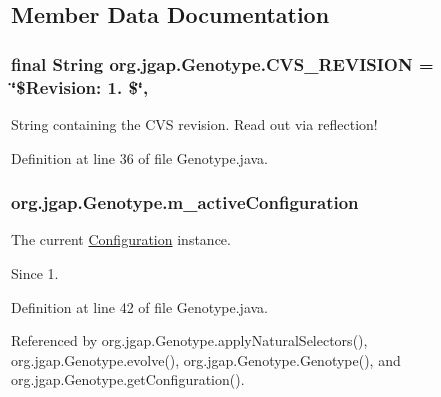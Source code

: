 \subsection{Member Data Documentation}
\hypertarget{classorg_1_1jgap_1_1_genotype_ac9f8e9d203b7a4efdf8c2e32a08f84bb}{
\subsubsection[{C\-V\-S\-\_\-\-R\-E\-V\-I\-S\-I\-O\-N}]{\setlength{\rightskip}{0pt plus 5cm}final String org.\-jgap.\-Genotype.\-C\-V\-S\-\_\-\-R\-E\-V\-I\-S\-I\-O\-N = \char`\"{}\$Revision\-: 1. \$\char`\"{}\hspace{0.3cm}{\ttfamily [static]}, {\ttfamily [private]}}}\label{classorg_1_1jgap_1_1_genotype_ac9f8e9d203b7a4efdf8c2e32a08f84bb}
String containing the C\-V\-S revision. Read out via reflection! 

Definition at line 36 of file Genotype.\-java.

\hypertarget{classorg_1_1jgap_1_1_genotype_aeb3fac2610b8ef8fa8599fcac1b6a199}{
\subsubsection[{m\-\_\-active\-Configuration}]{ org.\-jgap.\-Genotype.\-m\-\_\-active\-Configuration\hspace{0.3cm}{\ttfamily [private]}}}\label{classorg_1_1jgap_1_1_genotype_aeb3fac2610b8ef8fa8599fcac1b6a199}
The current \hyperlink{classorg_1_1jgap_1_1_configuration}{Configuration} instance. \begin{DoxySince}{Since}
1. 
\end{DoxySince}


Definition at line 42 of file Genotype.\-java.



Referenced by org.\-jgap.\-Genotype.\-apply\-Natural\-Selectors(), org.\-jgap.\-Genotype.\-evolve(), org.\-jgap.\-Genotype.\-Genotype(), and org.\-jgap.\-Genotype.\-get\-Configuration().

